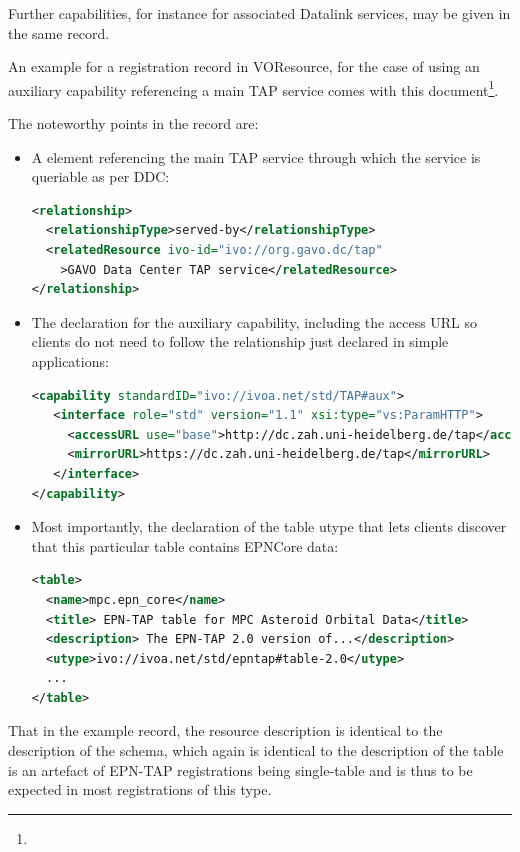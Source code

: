 \documentclass[11pt,a4paper]{ivoa}
\begin{document}
Further capabilities, for instance for associated Datalink services,
may be given in the same record.

An example for a registration record in VOResource, for the case of
using an auxiliary capability referencing a main TAP service comes with
this document\footnote{}.

The noteworthy points in the record are:

\begin{itemize}
\item A  element referencing the main TAP service
through which the service is queriable as per DDC:
\begin{lstlisting}[language=XML,basicstyle=\footnotesize]
<relationship>
  <relationshipType>served-by</relationshipType>
  <relatedResource ivo-id="ivo://org.gavo.dc/tap"
    >GAVO Data Center TAP service</relatedResource>
</relationship>
\end{lstlisting}

\item The declaration for the auxiliary capability, including the access
URL so clients do not need to follow the relationship just declared in
simple applications:
\begin{lstlisting}[language=XML,basicstyle=\footnotesize]
<capability standardID="ivo://ivoa.net/std/TAP#aux">
   <interface role="std" version="1.1" xsi:type="vs:ParamHTTP">
     <accessURL use="base">http://dc.zah.uni-heidelberg.de/tap</accessURL>
     <mirrorURL>https://dc.zah.uni-heidelberg.de/tap</mirrorURL>
   </interface>
</capability>
\end{lstlisting}

\item Most importantly, the declaration of the table utype that lets
clients discover that this particular table contains EPNCore data:
\begin{lstlisting}[language=XML,basicstyle=\footnotesize]
<table>
  <name>mpc.epn_core</name>
  <title> EPN-TAP table for MPC Asteroid Orbital Data</title>
  <description> The EPN-TAP 2.0 version of...</description>
  <utype>ivo://ivoa.net/std/epntap#table-2.0</utype>
  ...
</table>
\end{lstlisting}
\end{itemize}

That in the example record, the resource description is identical to the
description of the schema, which again is identical to the description
of the table is an artefact of EPN-TAP registrations being single-table
and is thus to be expected in most registrations of this type.
\end{document}
